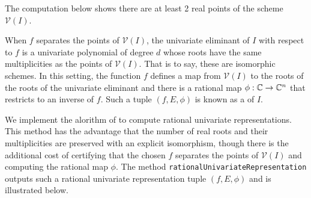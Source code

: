 The computation below shows there are at least 2 real points of the scheme $\mathcal{V}(I)$. 

%
\begin{leftbar}

\end{leftbar}
%

When $f$ separates the points of $\mathcal{V}(I)$, the univariate eliminant of $I$ with respect to $f$ is a univariate polynomial of degree $d$ whose roots have the same multiplicities as the points of $\mathcal{V}(I)$. That is to say, these are isomorphic schemes. In this setting, the function $f$ defines a map from $\mathcal{V}(I)$ to the roots of the roots of the univariate eliminant and there is a rational map $\phi:\mathbb{C}\to\mathbb{C}^n$ that restricts to an inverse of $f$. Such a tuple $(f,E,\phi)$ is known as a  of $I$. 

We implement the alorithm of  to compute rational univariate representations. This method has the advantage that the number of real roots and their multiplicities are preserved with an explicit isomorphism, though there is the additional cost of certifying that the chosen $f$ separates the points of $\mathcal{V}(I)$ and computing the rational map $\phi$. The method \texttt{rationalUnivariateRepresentation} outputs such a rational univariate representation tuple $(f,E,\phi)$ and is illustrated below.

%
\begin{leftbar}

\end{leftbar}
%
